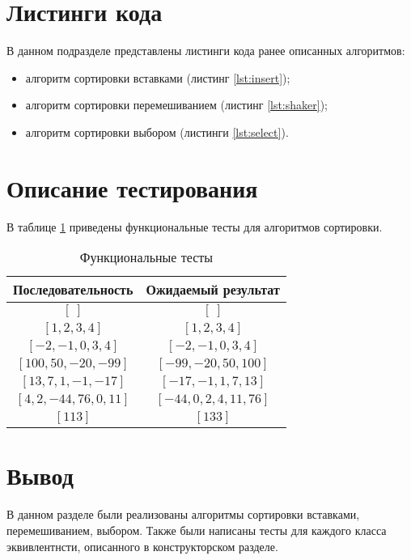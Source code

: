 \section{Листинги кода}

В данном подразделе представлены листинги кода ранее описанных алгоритмов:
\begin{itemize}[left=\parindent]
    \item алгоритм сортировки вставками (листинг \ref{lst:insert});
    \item алгоритм сортировки перемешиванием (листинг \ref{lst:shaker});
    \item алгоритм сортировки выбором (листинги \ref{lst:select}).
\end{itemize}


\section{Описание тестирования}

В таблице \ref{tab:tests} приведены функциональные тесты для алгоритмов
сортировки.

\begin{table}[h!]
	\begin{center}
    \begin{threeparttable}
        \captionsetup{justification=raggedright,singlelinecheck=off}
        \caption{\label{tab:tests}Функциональные тесты}
        \begin{tabular}{|c|c|}
			\hline
            \textbf{Последовательность} & \textbf{Ожидаемый результат} \\ [2mm]
            \hline
            $[~]$
            &
            $[~]$
            \\
            \hline
            $[1, 2, 3, 4]$
            &
            $[1, 2, 3, 4]$
            \\
            \hline
            $[-2, -1, 0, 3, 4]$
            &
            $[-2, -1, 0, 3, 4]$
            \\
            \hline
            $[100, 50, -20, -99]$
            &
            $[-99, -20, 50, 100]$
            \\
            \hline
            $[13, 7, 1, -1, -17]$
            &
            $[-17, -1, 1, 7, 13]$
            \\
            \hline
            $[4, 2, -44, 76, 0, 11]$
            &
            $[-44, 0, 2, 4, 11, 76]$
            \\
            \hline
            $[113]$
            &
            $[133]$
            \\
            \hline
		\end{tabular}
    \end{threeparttable} 
	\end{center}
\end{table}

\section{Вывод}

В данном разделе были реализованы алгоритмы сортировки вставками, перемешиванием, выбором. Также были написаны тесты для каждого класса эквивлентнсти, описанного в конструкторском разделе.
